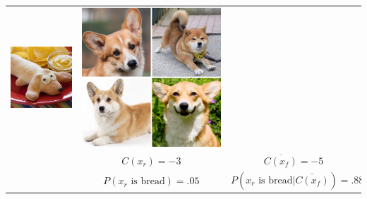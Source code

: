 \documentclass{article}
\begin{document}
\begin{table}
\begin{tabular}{ccc}
\begin{minipage}[c]{0.15\textwidth}
			\includegraphics[width=\textwidth]{bread_real_2.png}
		\end{minipage} & 
		\begin{minipage}[c]{0.30\textwidth}
			\centering
			\includegraphics[width=\textwidth]{corgi_fake_1.png}
		\end{minipage}
		\\
		& $C(x_r)=-3$ & $\overline{C(x_f)}=-5$ \\
		& $P(x_r \text{ is bread})=.05$ & $P(x_r \text{ is bread} | \overline{C(x_f)})=.88$ \\
		\bottomrule
	\end{tabular}
\end{table}
\end{document}
